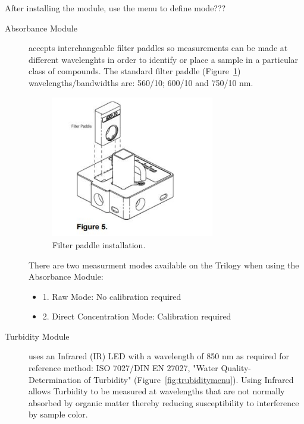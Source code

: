 \documentclass[12pt]{../SOP4_alpha}\usepackage[]{graphicx}\usepackage[]{color}
\begin{document}
\NP After installing the module, use the menu to define mode???

\begin{description}
  \item[Absorbance Module] accepts interchangeable filter paddles so measurements can be made at different wavelenghts in order to identify or place a sample in a particular class of compounds. 
  The standard filter paddle (Figure~\ref{fig:filterpaddle}) wavelengths/bandwidths are: 560/10; 600/10 and 750/10 nm.
  
\begin{figure}
  \centering
  \includegraphics[width=0.7\textwidth]{figure5}
  \caption{Filter paddle installation.}
  \label{fig:filterpaddle}
\end{figure}

  \NP There are two measurment modes available on the Trilogy when using the Absorbance Module:
\begin{itemize}
  \item 1. Raw Mode: No calibration required
  \item 2. Direct Concentration Mode: Calibration required
\end{itemize}
  
  
  \item[Turbidity Module] uses an Infrared (IR) LED with a wavelength of 850 nm as required for reference method: ISO 7027/DIN EN 27027, "Water Quality- Determination of Turbidity" (Figure~\ref{fig:trubiditymenu}). Using Infrared allows Turbidity to be measured at wavelengths that are not normally absorbed by organic matter thereby reducing susceptibility to interference by sample color. 


\end{description}
\end{document}
